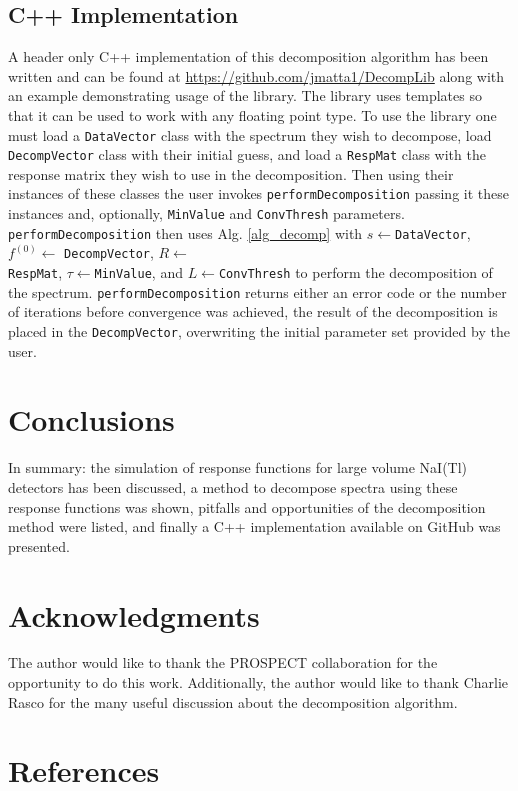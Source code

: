 \documentclass[5p]{elsarticle}
\newcommand{\ic}[1]{\lstinline$#1$}
\begin{document}
\subsection{C++ Implementation}


A header only C++ implementation of this decomposition algorithm has been written and can be found at \url{https://github.com/jmatta1/DecompLib} along with an example demonstrating usage of the library. The library uses templates so that it can be used to work with any floating point type. To use the library one must load a \ic{DataVector} class with the spectrum they wish to decompose, load \ic{DecompVector} class with their initial guess, and load a \ic{RespMat} class with the response matrix they wish to use in the decomposition. Then using their instances of these classes the user invokes \ic{performDecomposition} passing it these instances and, optionally, \ic{MinValue} and \ic{ConvThresh} parameters. \ic{performDecomposition} then uses Alg. \ref{alg_decomp} with $s \gets$\ic{DataVector}, $f^{(0)} \gets$ \ic{DecompVector}, $R \gets$ \\ \ic{RespMat}, $\tau{} \gets$\ic{MinValue}, and $L \gets$\ic{ConvThresh} to perform the decomposition of the spectrum. \ic{performDecomposition} returns either an error code or the number of iterations before convergence was achieved, the result of the decomposition is placed in the \ic{DecompVector}, overwriting the initial parameter set provided by the user.

\section{Conclusions}
In summary: the simulation of response functions for large volume NaI(Tl) detectors has been discussed, a method to decompose spectra using these response functions was shown, pitfalls and opportunities of the decomposition method were listed, and finally a C++ implementation available on GitHub was presented.

\section{Acknowledgments}
The author would like to thank the PROSPECT collaboration for the opportunity to do this work. Additionally, the author would like to thank Charlie Rasco for the many useful discussion about the decomposition algorithm.

\section*{References}



\end{document}
